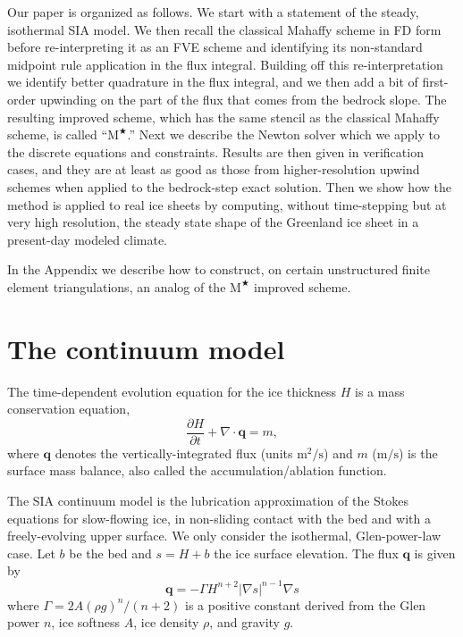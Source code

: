 \documentclass[twocolumn,letterpaper]{igs}
\newcommand\bq{\mathbf{q}}
\newcommand{\Div}{\nabla\cdot}
\newcommand{\grad}{\nabla}
\newcommand{\Mstar}{$\text{M}^{\bigstar}$\xspace}
\begin{document}
Our paper is organized as follows.  We start with a statement of the steady, isothermal SIA model.  We then recall the classical Mahaffy scheme in FD form before re-interpreting it as an FVE scheme and identifying its non-standard midpoint rule application in the flux integral.  Building off this re-interpretation we identify better quadrature in the flux integral, and we then add a bit of first-order upwinding on the part of the flux that comes from the bedrock slope.  The resulting improved scheme, which has the same stencil as the classical Mahaffy scheme, is called ``\Mstar.''  Next we describe the Newton solver which we apply to the discrete equations and constraints.  Results are then given in verification cases, and they are at least as good as those from higher-resolution upwind schemes when applied to the \cite{JaroschSchoofAnslow2013} bedrock-step exact solution.  Then we show how the method is applied to real ice sheets by computing, without time-stepping but at very high resolution, the steady state shape of the Greenland ice sheet in a present-day modeled climate.

In the Appendix we describe how to construct, on certain unstructured finite element triangulations, an analog of the \Mstar improved scheme.


\section*{The continuum model}

The time-dependent evolution equation for the ice thickness $H$ is a mass conservation equation,
\begin{equation}
\frac{\partial H}{\partial t} + \Div \bq = m,  \label{eq:siaevolution}
\end{equation}
where $\bq$ denotes the vertically-integrated flux (units $\text{m}^2/\text{s}$) and $m$ ($\text{m}/\text{s}$) is the surface mass balance, also called the accumulation/ablation function.

The SIA continuum model is the lubrication approximation \citep{Fowler1997} of the Stokes equations for slow-flowing ice, in non-sliding contact with the bed and with a freely-evolving upper surface.  We only consider the isothermal, Glen-power-law \citep{GreveBlatter2009} case.  Let $b$ be the bed and $s = H+b$ the ice surface elevation.  The flux $\bq$ is given by
\begin{equation}
\bq = - \Gamma H^{n+2} |\grad s|^{n-1} \grad s  \label{eq:siaflux}
\end{equation}
where $\Gamma = 2 A (\rho g)^n / (n+2)$ is a positive constant derived from the Glen power $n$, ice softness $A$, ice density $\rho$, and gravity $g$.
\end{document}
